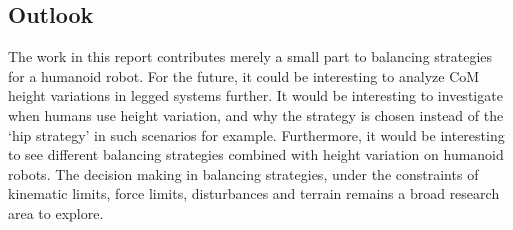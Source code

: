 \subsection{Outlook}
The work in this report contributes merely a small part to balancing strategies for a humanoid robot. For the future, it could be interesting to analyze \ac{CoM} height variations in legged systems further. It would be interesting to investigate when humans use height variation, and why the strategy is chosen instead of the `hip strategy' in such scenarios for example. Furthermore, it would be interesting to see different balancing strategies combined with height variation on humanoid robots. The decision making in balancing strategies, under the constraints of kinematic limits, force limits, disturbances and terrain remains a broad research area to explore.